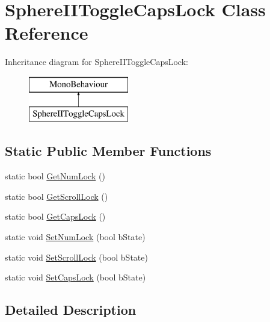 \hypertarget{class_sphere_i_i_toggle_caps_lock}{}\section{Sphere\+I\+I\+Toggle\+Caps\+Lock Class Reference}
\label{class_sphere_i_i_toggle_caps_lock}
Inheritance diagram for Sphere\+I\+I\+Toggle\+Caps\+Lock\+:\begin{figure}[H]
\begin{center}
\leavevmode
\includegraphics[height=2.000000cm]{class_sphere_i_i_toggle_caps_lock}
\end{center}
\end{figure}
\subsection*{Static Public Member Functions}
\begin{DoxyCompactItemize}
\item 
static bool \mbox{\hyperlink{class_sphere_i_i_toggle_caps_lock_a1b6978f053626621672a251e6c40c3a2}{Get\+Num\+Lock}} ()
\item 
static bool \mbox{\hyperlink{class_sphere_i_i_toggle_caps_lock_a0eff2dfb670c381cfe929800250b8ed0}{Get\+Scroll\+Lock}} ()
\item 
static bool \mbox{\hyperlink{class_sphere_i_i_toggle_caps_lock_a684bc925850f81d58ef9d4c7500a0a86}{Get\+Caps\+Lock}} ()
\item 
static void \mbox{\hyperlink{class_sphere_i_i_toggle_caps_lock_a2cf9b477dbc8503b11958438fa9cc69d}{Set\+Num\+Lock}} (bool b\+State)
\item 
static void \mbox{\hyperlink{class_sphere_i_i_toggle_caps_lock_a9bcfc13eeb39d6b83d6d9215dccf620e}{Set\+Scroll\+Lock}} (bool b\+State)
\item 
static void \mbox{\hyperlink{class_sphere_i_i_toggle_caps_lock_a2a6a8e77a1901b4a6358dee035f67b9a}{Set\+Caps\+Lock}} (bool b\+State)
\end{DoxyCompactItemize}


\subsection{Detailed Description}



